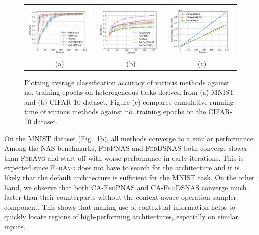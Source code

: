\begin{figure}[h]
\begin{tabular}{ccc}
\hspace{-6mm}
\includegraphics[width=0.33\columnwidth]{nas_plots/exp4.png} & 
\hspace{-6mm}
\includegraphics[width=0.33\columnwidth]{nas_plots/exp3.png} & 
\hspace{-6mm}
\includegraphics[width=0.33\columnwidth]{nas_plots/exp8.png} \\
\hspace{-6mm} (a) & 
\hspace{-6mm} (b) & 
\hspace{-6mm} (c)
\end{tabular}    
\caption{Plotting average classification accuracy of various methods against no. training epochs on heterogeneous tasks derived from (a) MNIST and (b) CIFAR-10 dataset. Figure (c) compares cumulative running time of various methods against no. training epochs on the CIFAR-10 dataset.}
\label{fig4}
\end{figure} 
On the MNIST dataset (Fig.~\ref{fig4}b), all methods converge to a similar performance. Among the NAS benchmarks, \textsc{FedPNAS} and \textsc{FedDSNAS} both converge slower than \textsc{FedAvg} and start off with worse performance in early iterations. This is expected since \textsc{FedAvg} does not have to search for the architecture and it is likely that the default architecture is sufficient for the MNIST task. On the other hand, we observe that both \textsc{CA-FedPNAS} and \textsc{CA-FedDSNAS} converge much faster than their counterparts without the context-aware operation sampler component. This shows that making use of contextual information helps to quickly locate regions of high-performing architectures, especially on similar inputs.


